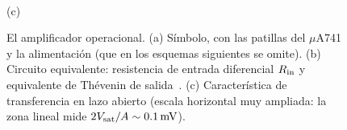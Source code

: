 \begin{figure}[ht]
\begin{minipage}[b]{0.30\textwidth}
\\[2pt]
{\small (c)}
\end{minipage}
\caption{El amplificador operacional. (a) Símbolo, con las patillas del $\mu$A741 y la
alimentación (que en los esquemas siguientes se omite). (b) Circuito equivalente: resistencia
de entrada diferencial $R_{\mathrm{in}}$ y equivalente de Thévenin de salida~\cite{TEORIA-EA,SEDRA}. (c)
Característica de transferencia en lazo abierto (escala horizontal muy ampliada: la zona lineal
mide $2V_{\mathrm{sat}}/A\sim\SI{0.1}{\milli\volt}$).}
\label{fig:ao}
\end{figure}
